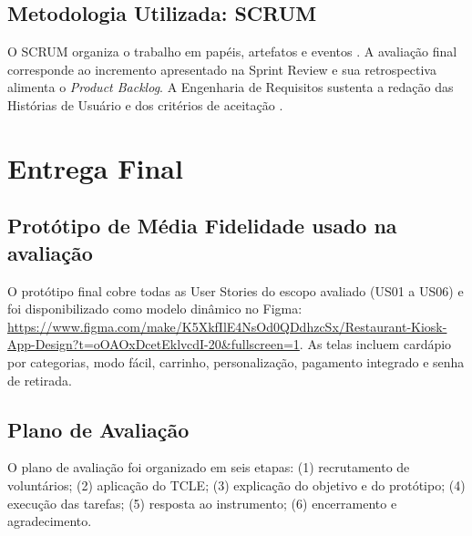 \documentclass[12pt, oneside, a4paper, chapter=TITLE,section=TITLE]{abntex2}
\begin{document}
\section{Metodologia Utilizada: SCRUM}

O SCRUM organiza o trabalho em papéis, artefatos e eventos \cite{schwaber2017scrum}. A avaliação final corresponde ao incremento apresentado na Sprint Review e sua retrospectiva alimenta o \textit{Product Backlog}. A Engenharia de Requisitos sustenta a redação das Histórias de Usuário e dos critérios de aceitação \cite{wazlawick2019engenharia}.

\chapter{Entrega Final}

\section{Protótipo de Média Fidelidade usado na avaliação}

O protótipo final cobre todas as User Stories do escopo avaliado (US01 a US06) e foi disponibilizado como modelo dinâmico no Figma: \url{https://www.figma.com/make/K5XkfIlE4NsOd0QDdhzcSx/Restaurant-Kiosk-App-Design?t=oOAOxDcetEklvcdI-20&fullscreen=1}. As telas incluem cardápio por categorias, modo fácil, carrinho, personalização, pagamento integrado e senha de retirada.

\section{Plano de Avaliação}

O plano de avaliação foi organizado em seis etapas: (1) recrutamento de voluntários; (2) aplicação do TCLE; (3) explicação do objetivo e do protótipo; (4) execução das tarefas; (5) resposta ao instrumento; (6) encerramento e agradecimento.

\begin{table}[ht]
\centering
\caption{Roteiro de execução da avaliação.}
\end{table}
\end{document}
